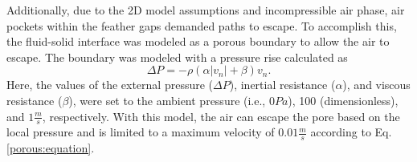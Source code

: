 \documentclass{UCF_ETD}
\begin{document}
Additionally, due to the 2D model assumptions and incompressible air phase, air pockets within the feather gaps demanded paths to escape. To accomplish this, %
the fluid-solid interface
was modeled as %
a porous boundary to allow the air to escape. The boundary was modeled with a pressure rise calculated as
\begin{equation}
\label{porous:equation}
    \Delta P = -\rho (\alpha |v_n| + \beta)v_n.
\end{equation}
Here, the values of the external pressure ($\Delta P$), inertial resistance ($\alpha$), and viscous resistance ($\beta$), were set to the ambient pressure (i.e., $0 Pa$), 100 (dimensionless), and $1 \frac{m}{s}$, respectively. With this model, the air can escape the pore based on the local pressure and is limited to a maximum velocity of $0.01 \frac{m}{s}$ according to Eq. \ref{porous:equation}.






\end{document}
